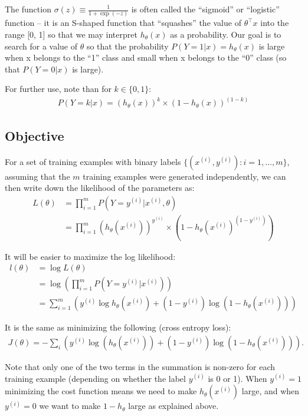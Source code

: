 The function $\sigma(z) \equiv \frac{1}{1 + \exp(-z)}$ is often called the “sigmoid” or “logistic” function – it is an S-shaped function that “squashes” the value of $\theta^\top x$ into the range [0, 1] so that we may interpret $h_\theta(x)$ as a probability. Our goal is to search for a value of $\theta$ so that the probability $P(Y=1|x) = h_\theta(x)$ is large when x belongs to the “1” class and small when x belongs to the “0” class (so that $P(Y=0|x)$ is large). 

For further use, note than for $k \in \{0,1\}$:
\begin{align}
	P(Y=k|x) = (h_\theta(x))^k \times (1 - h_\theta(x))^{(1-k)}
\end{align}

\subsection{Objective}
For a set of training examples with binary labels $\{ (x^{(i)}, y^{(i)}) : i=1,\ldots,m\}$, assuming that the $m$ training examples were generated independently, we can then write down the likelihood of the parameters as:
\begin{align}
	L(\theta) &= \prod_{i=1}^m P(Y=y^{(i)} | x^{(i)}, \theta) \\
			  &= \prod_{i=1}^m (h_\theta(x^{(i)}))^{y^{(i)}} \times (1 - h_\theta(x^{(i)})^{(1-y^{(i)})})
\end{align}

It will be easier to maximize the log likelihood:
\begin{align}
	l(\theta) &= \log L(\theta) \\
			  &= \log \left( \prod_{i=1}^m P(Y=y^{(i)} | x^{(i)}) \right) \\
			  &= \sum_{i=1}^m \left( y^{(i)}\log h_\theta(x^{(i)}) + (1-y^{(i)})\log (1 - h_\theta(x^{(i)})) \right)
\end{align}

It is the same as minimizing the following (cross entropy loss):
\begin{align}
	J(\theta) = - \sum_i \left(y^{(i)} \log( h_\theta(x^{(i)}) ) + (1 - y^{(i)}) \log( 1 - h_\theta(x^{(i)}) ) \right).
\end{align}


Note that only one of the two terms in the summation is non-zero for each training example (depending on whether the label $y^{(i)}$ is 0 or 1). When $y^{(i)} = 1$ minimizing the cost function means we need to make $h_\theta(x^{(i)})$ large, and when $y^{(i)} = 0$ we want to make $1 - h_\theta$ large as explained above.

